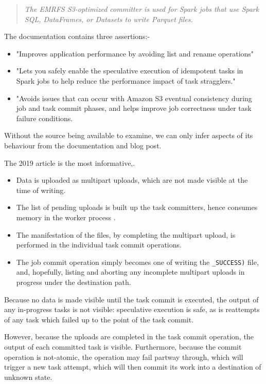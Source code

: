 \documentclass[conference]{IEEEtran}
\begin{document}
\begin{quote}
\emph{
The EMRFS S3-optimized committer is used for Spark jobs that use Spark SQL,
DataFrames, or Datasets to write Parquet files.}
\end{quote}

The documentation contains three assertions:-

\begin{itemize}
  \item "Improves application performance by avoiding list and rename operations"
  \item "Lets you safely enable the speculative execution of idempotent tasks in Spark jobs to help reduce the performance impact of task stragglers."
  \item "Avoids issues that can occur with Amazon S3 eventual consistency during job and task commit phases, and helps improve job correctness under task failure conditions.
\end{itemize}


Without the source being available to examine, we can only infer aspects
of its behaviour from the documentation and blog post.

The 2019 article is the most informative,.

\begin{itemize}
  \item Data is uploaded as multipart uploads, which are not made visible at the time of writing.
  \item The list of pending uploads is built up the task committers, hence consumes memory in the worker process \cite{AWS-EMR-committer-tuning}.
  \item The manifestation of the files, by completing the multipart upload, is performed in the individual task commit operations.
  \item The job commit operation simply becomes one of writing the \texttt{_SUCCESS)} file, and, hopefully, listing and aborting any incomplete
  multipart uploads in progress under the destination path.

\end{itemize}

Because no data is made visible until the task commit is executed, the output
of any in-progress tasks is not visible: speculative execution is safe,
as is reattempts of any task which failed up to the point of the task commit.

However, because the uploads are completed in the task commit operation,
the output of each committed task is visible.
Furthermore, because the commit operation is not-atomic, the operation may
fail partway through, which will trigger a new task attempt, which
will then commit its work into a destination of unknown state.
\end{document}
